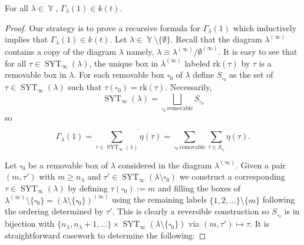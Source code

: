 \documentclass[10pt,a4paper]{amsart}
\DeclareMathOperator{\Par}{\mathbb{Y}}
\DeclareMathOperator{\SYT}{\mathrm{SYT}}
\begin{document}
\begin{thm}\label{rationality thm}
    For all $\lambda \in \Par$, $\Gamma_{\lambda}(1) \in k(t).$ 
\end{thm}

\begin{proof}
    Our strategy is to prove a recursive formula for $\Gamma_{\lambda}(1)$ which inductively implies that $\Gamma_{\lambda}(1) \in k(t)$. Let $\lambda \in \Par \setminus \{\emptyset\}.$ Recall that the diagram $\lambda^{(\infty)}$ contains a copy of the diagram $\lambda$ namely, $\lambda \equiv \lambda^{(\infty)}/\emptyset^{(\infty)}$. It is easy to see that for all $\tau \in \SYT_{\infty}(\lambda)$, the unique box in $\lambda^{(\infty)}$ labeled $\mathrm{rk}(\tau)$ by $\tau$ is a removable box in $\lambda$. For each removable box $\square_{0}$ of $\lambda$ define $S_{\square_{0}}$ as the set of $\tau \in \SYT_{\infty}(\lambda)$ such that $\tau(\square_0) = \mathrm{rk}(\tau).$ Necessarily,
    $$\SYT_{\infty}(\lambda) = \bigsqcup_{\square_0~ \text{removable}} S_{\square_0}$$ so 

    $$\Gamma_{\lambda}(1) = \sum_{\tau \in \SYT_{\infty}(\lambda)} \eta(\tau) = \sum_{\square_0~ \text{removable}} \sum_{\tau\in S_{\square_0}} \eta(\tau).$$ 

    Let $\square_0$ be a removable box of $\lambda$ considered in the diagram $\lambda^{(\infty)}$. Given a pair $(m,\tau')$ with $m\geq n_{\lambda}$ and $\tau' \in \SYT_{\infty}(\lambda \setminus \square_0)$ we construct a corresponding $\tau\in \SYT_{\infty}(\lambda)$ by defining $\tau(\square_0) := m$ and filling the boxes of $\lambda^{(\infty)}\setminus \{\square_0\} = (\lambda\setminus \{\square_0\})^{(\infty)}$ using the remaining labels $\{1,2,\dots\} \setminus \{m\}$ following the ordering determined by $\tau'.$ This is clearly a reversible construction so $S_{\square_0}$ is in bijection with $\{n_{\lambda},n_{\lambda}+1,\dots\} \times \SYT_{\infty}(\lambda \setminus \{\square_0\})$ via $(m,\tau') \mapsto \tau.$ It is straightforward casework to determine the following:


\end{proof}
\end{document}
